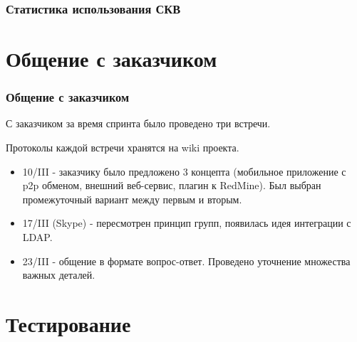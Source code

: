 \documentclass{beamer}
\newlength{\wideitemsep}
\let\olditem\item
\renewcommand{\item}{\setlength{\itemsep}{\wideitemsep}\olditem}
\begin{document}
\begin{frame}
\frametitle{Статистика использования СКВ}



\end{frame}

\section{Общение с заказчиком}

\begin{frame}
\frametitle{Общение с заказчиком}

С заказчиком за время спринта было проведено три встречи.

Протоколы каждой встречи хранятся на wiki проекта.

\begin{itemize}
\item 10/III - заказчику было предложено 3 концепта (мобильное приложение с p2p обменом, внешний веб-сервис, плагин к RedMine). Был выбран промежуточный вариант между первым и вторым.
\item 17/III (Skype) - пересмотрен принцип групп, появилась идея интеграции с LDAP.
\item 23/III - общение в формате вопрос-ответ. Проведено уточнение множества важных деталей.
\end{itemize}

\end{frame}


\section{Тестирование}
\end{document}
